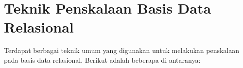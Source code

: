 \section{Teknik Penskalaan Basis Data Relasional}

Terdapat berbagai teknik umum yang digunakan untuk melakukan penskalaan pada basis data relasional. Berikut adalah beberapa di antaranya:





